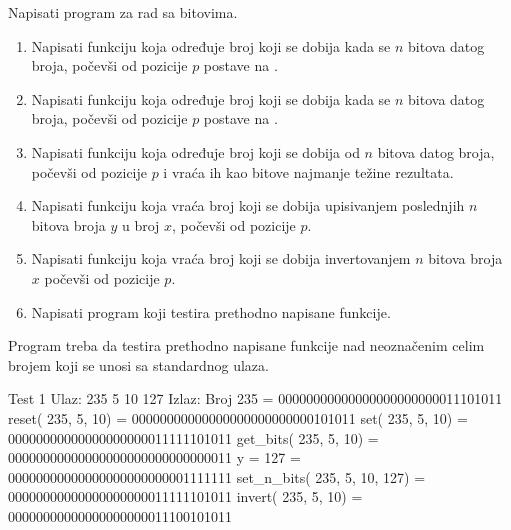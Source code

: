 \begin{Exercise}[label=204]
Napisati program za rad sa bitovima.
\begin{enumerate}
\item Napisati funkciju koja određuje broj koji se dobija kada se $n$ bitova datog broja, počevši od pozicije $p$ postave na .
\item Napisati funkciju koja određuje broj koji se dobija kada se $n$ bitova datog broja, počevši od pozicije $p$ postave na .
\item Napisati funkciju koja određuje broj koji se dobija od $n$ bitova datog broja, počevši od pozicije $p$ i vraća ih kao bitove najmanje težine rezultata.
\item Napisati funkciju koja vraća broj koji se dobija upisivanjem poslednjih $n$ bitova broja $y$ u broj $x$, počevši od pozicije $p$.
\item Napisati funkciju koja vraća broj koji se dobija invertovanjem $n$ bitova broja $x$ počevši od pozicije $p$.
\item Napisati program koji testira prethodno napisane funkcije.
\end{enumerate}
Program treba da testira prethodno napisane funkcije nad neoznačenim celim brojem koji se unosi sa standardnog ulaza.
\begin{maxitest}
\begin{test}{Test 1}
Ulaz:   235 5 10 127  
Izlaz:  
  Broj   235                          = 00000000000000000000000011101011
  reset(  235,    5,   10)            = 00000000000000000000000000101011
  set(  235,    5,   10)              = 00000000000000000000011111101011
  get_bits(  235,    5,   10)         = 00000000000000000000000000000011
  y =                             127 = 00000000000000000000000001111111
  set_n_bits(  235,    5,   10,  127) = 00000000000000000000011111101011
  invert(  235,    5,   10)           = 00000000000000000000011100101011
\end{test}
\end{maxitest}

\end{Exercise}
\begin{Answer}[ref=204]
\end{Answer}


